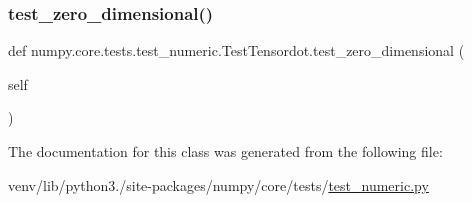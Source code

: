 \mbox{\label{classnumpy_1_1core_1_1tests_1_1test__numeric_1_1TestTensordot_a19cff1b490847cf1c1b04d36f8fd3419}} 
\subsubsection{\texorpdfstring{test\+\_\+zero\+\_\+dimensional()}{test\_zero\_dimensional()}}
{\footnotesize\ttfamily def numpy.\+core.\+tests.\+test\+\_\+numeric.\+Test\+Tensordot.\+test\+\_\+zero\+\_\+dimensional (\begin{DoxyParamCaption}\item[{}]{self }\end{DoxyParamCaption})}



The documentation for this class was generated from the following file\+:\begin{DoxyCompactItemize}
\item 
venv/lib/python3./site-\/packages/numpy/core/tests/\hyperlink{core_2tests_2test__numeric_8py}{test\+\_\+numeric.\+py}\end{DoxyCompactItemize}
